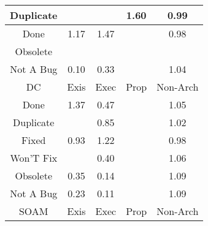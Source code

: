 \begin{tabular}{|c||c|c|c|c|}
\hline
Duplicate &  &  & \cellcolor[rgb]{0.7658712362184537,0.7717284803140043,0.41999999999999993} 1.60 & \cellcolor[rgb]{0.9087506886838259,0.8340865931034424,0.41883397610490414} 0.99 \\ 
\hline
Done & \cellcolor[rgb]{0.8698734772045482,0.8209926997284702,0.42} 1.17 & \cellcolor[rgb]{0.7983332419602448,0.7871052198759054,0.42} 1.47 &  & \cellcolor[rgb]{0.9072739228832624,0.8270965683141082,0.41745566135771145} 0.98 \\ 
\hline
Obsolete &  &  &  &  \\ 
\hline
Not A Bug & \cellcolor[rgb]{0.76,0.13,0.28} 0.10 & \cellcolor[rgb]{0.7988512128099503,0.31389574063376435,0.31626113195595357} 0.33 &  & \cellcolor[rgb]{0.9013964042522189,0.8359246125405246,0.42} 1.04 \\ 
\hline
\hline
DC & Exis & Exec & Prop & Non-Arch \\ 
\hline
Done & \cellcolor[rgb]{0.8213464525965803,0.7980062143878538,0.42} 1.37 & \cellcolor[rgb]{0.821342581854049,0.4203548874424986,0.33725307639711244} 0.47 &  & \cellcolor[rgb]{0.8980512829072453,0.8343400813771161,0.42} 1.05 \\ 
\hline
Duplicate &  & \cellcolor[rgb]{0.8846174193261099,0.7198557848102533,0.39630959137103583} 0.85 &  & \cellcolor[rgb]{0.9061988361856893,0.8381994487195369,0.42} 1.02 \\ 
\hline
Fixed & \cellcolor[rgb]{0.898415610661722,0.7851672237988176,0.4091879032842739} 0.93 & \cellcolor[rgb]{0.8573671504120375,0.8150686501951756,0.42} 1.22 &  & \cellcolor[rgb]{0.9064308704578526,0.8231061201671692,0.4166688124273291} 0.98 \\ 
\hline
Won'T Fix &  & \cellcolor[rgb]{0.8096262783705169,0.36489771762044665,0.32631785981248246} 0.40 &  & \cellcolor[rgb]{0.8960665293806326,0.8333999349697734,0.42} 1.06 \\ 
\hline
Obsolete & \cellcolor[rgb]{0.8018518119885447,0.3280985767457788,0.3190616911893085} 0.35 & \cellcolor[rgb]{0.7670812697405953,0.1635180101054846,0.2866091850912223} 0.14 &  & \cellcolor[rgb]{0.8889536500534795,0.8300306763411218,0.42} 1.09 \\ 
\hline
Not A Bug & \cellcolor[rgb]{0.7823354612578112,0.23572118328697295,0.30084643050729043} 0.23 & \cellcolor[rgb]{0.7621325571321216,0.14009410375870873,0.28199038665664683} 0.11 &  & \cellcolor[rgb]{0.887983146554296,0.829570964157298,0.42} 1.09 \\ 
\hline
\hline
SOAM & Exis & Exec & Prop & Non-Arch \\ 

\end{tabular}
